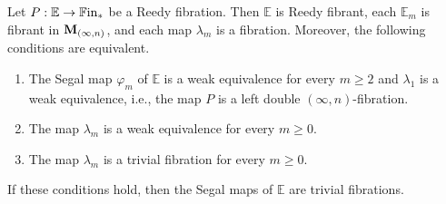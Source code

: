 \documentclass[10pt,reqno]{amsart}
\begin{document}
\begin{proposition}
\label{prop:minimal_axioms}
Let $P:\mathbb E\to\mathbb{F}\mathrm{in}_*$ be a Reedy fibration. Then
$\mathbb E$ is Reedy fibrant, each $\mathbb E_m$ is fibrant in
$\mathbf M_{(\infty,n)}$, and each map $\lambda_m$ is a fibration. Moreover, the
following conditions are equivalent.
\begin{enumerate}[label=\textup{(\roman*)}]
\item The Segal map $\varphi_m$ of $\mathbb E$ is a weak
      equivalence for every $m\geq2$ and $\lambda_1$ is a weak
      equivalence, i.e., the map $P$ is a left double
      $(\infty,n)$-fibration.
\item The map $\lambda_m$ is a weak equivalence for every
      $m\geq 0$.
\item The map $\lambda_m$ is a trivial fibration for every
      $m\geq 0$.
\end{enumerate}
If these conditions hold, then the Segal maps of $\mathbb E$ are
trivial fibrations.
\end{proposition}
\end{document}
